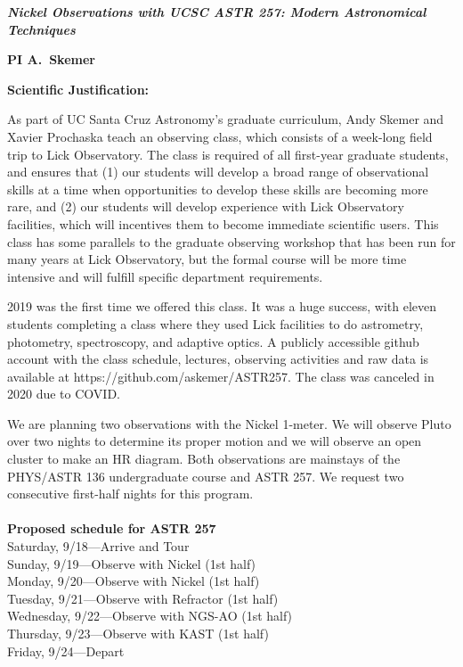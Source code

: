 \documentclass[12pt]{article}
\begin{document}
\noindent
\centerline{\bf \textit{Nickel Observations with UCSC ASTR 257: Modern Astronomical Techniques}} 
\centerline{\bf PI A.\ Skemer}

\vskip 15pt

\centerline{\bf  Scientific Justification: }

As part of UC Santa Cruz Astronomy's graduate curriculum, Andy Skemer and Xavier Prochaska teach an observing class, which consists of a week-long field trip to Lick Observatory.  The class is required of all first-year graduate students, and ensures that (1) our students will develop a broad range of observational skills at a time when opportunities to develop these skills are becoming more rare, and (2) our students will develop experience with Lick Observatory facilities, which will incentives them to become immediate scientific users.  This class has some parallels to the graduate observing workshop that has been run for many years at Lick Observatory, but the formal course will be more time intensive and will fulfill specific department requirements.

2019 was the first time we offered this class.  It was a huge success, with eleven students completing a class where they used Lick facilities to do astrometry, photometry, spectroscopy, and adaptive optics.  A publicly accessible github account with the class schedule, lectures, observing activities and raw data is available at https://github.com/askemer/ASTR257.  The class was canceled in 2020 due to COVID.

We are planning two observations with the Nickel 1-meter.  We will observe Pluto over two nights to determine its proper motion and we will observe an open cluster to make an HR diagram.  Both observations are mainstays of the PHYS/ASTR 136 undergraduate course and ASTR 257.  We request two consecutive first-half nights for this program.
\\\\
\textbf{Proposed schedule for ASTR 257}\\
Saturday, 9/18—Arrive and Tour\\
Sunday, 9/19—Observe with Nickel (1st half)\\
Monday, 9/20—Observe with Nickel (1st half)\\
Tuesday, 9/21—Observe with Refractor (1st half)\\
Wednesday, 9/22—Observe with NGS-AO (1st half)\\
Thursday, 9/23—Observe with KAST (1st half)\\
Friday, 9/24—Depart

\newpage
\end{document}
